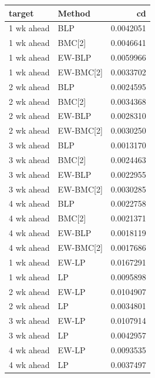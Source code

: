 \documentclass[
]{article}
\begin{document}
\begin{tabular}{l|l|r}
\hline
target & Method & cd\\
\hline
1 wk ahead & BLP & 0.0042051\\
\hline
1 wk ahead & BMC[2] & 0.0046641\\
\hline
1 wk ahead & EW-BLP & 0.0059966\\
\hline
1 wk ahead & EW-BMC[2] & 0.0033702\\
\hline
2 wk ahead & BLP & 0.0024595\\
\hline
2 wk ahead & BMC[2] & 0.0034368\\
\hline
2 wk ahead & EW-BLP & 0.0028310\\
\hline
2 wk ahead & EW-BMC[2] & 0.0030250\\
\hline
3 wk ahead & BLP & 0.0013170\\
\hline
3 wk ahead & BMC[2] & 0.0024463\\
\hline
3 wk ahead & EW-BLP & 0.0022955\\
\hline
3 wk ahead & EW-BMC[2] & 0.0030285\\
\hline
4 wk ahead & BLP & 0.0022758\\
\hline
4 wk ahead & BMC[2] & 0.0021371\\
\hline
4 wk ahead & EW-BLP & 0.0018119\\
\hline
4 wk ahead & EW-BMC[2] & 0.0017686\\
\hline
1 wk ahead & EW-LP & 0.0167291\\
\hline
1 wk ahead & LP & 0.0095898\\
\hline
2 wk ahead & EW-LP & 0.0104907\\
\hline
2 wk ahead & LP & 0.0034801\\
\hline
3 wk ahead & EW-LP & 0.0107914\\
\hline
3 wk ahead & LP & 0.0042957\\
\hline
4 wk ahead & EW-LP & 0.0093535\\
\hline
4 wk ahead & LP & 0.0037497\\
\hline
\end{tabular}
\end{document}
